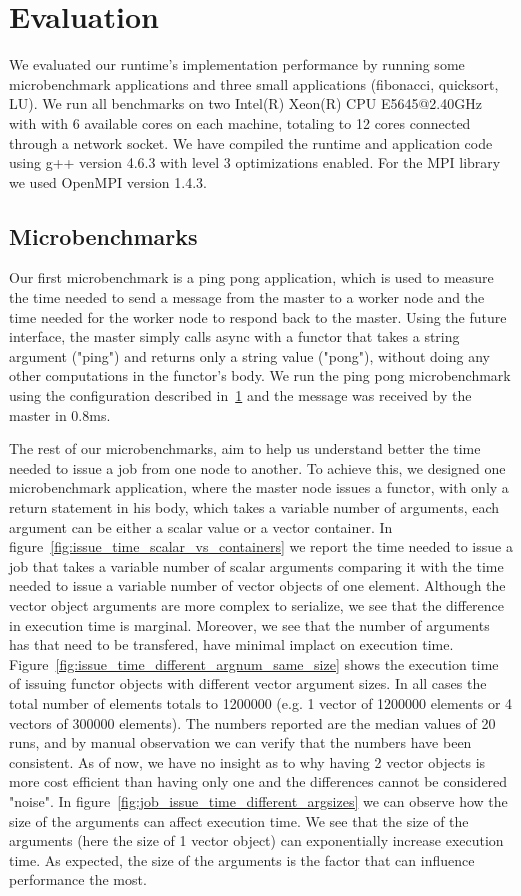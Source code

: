 \chapter{Evaluation}
\label{sect:eval_intro}
	We evaluated our runtime's implementation performance by running some microbenchmark applications and
three small applications (fibonacci, quicksort, LU).  We run all benchmarks on two Intel(R) Xeon(R) 
CPU E5645@2.40GHz with with 6 available cores on each machine, totaling to 12 cores connected through 
a network socket. We have compiled the runtime and application code using g++ version 4.6.3 with 
level 3 optimizations enabled.  For the MPI library we used OpenMPI version 1.4.3.

\section{Microbenchmarks}
\label{sect:microbenchmark}
	Our first microbenchmark is a ping pong application, which is used to measure the time needed to send a 
message from the master to a worker node and the time needed for the worker node to respond back to the master.
Using the future interface, the master simply calls async with a functor that takes a string argument ("ping") 
and returns only a string value ("pong"), without doing any other computations in the functor's body.  We run
the ping pong microbenchmark using the configuration described in~\ref{sect:eval_intro} and the message was 
received by the master in 0.8ms.


	The rest of our microbenchmarks, aim to help us understand better the time needed to issue a job from one
node to another.  To achieve this, we designed one microbenchmark application, where the master node issues
a functor, with only a return statement in his body, which takes a variable number of arguments, each argument
can be either a scalar value or a vector container.  In figure~\ref{fig:issue_time_scalar_vs_containers} we report
the time needed to issue a job that takes a variable number of scalar arguments comparing it with the time needed
to issue a variable number of vector objects of one element.  Although the vector object arguments are more complex
to serialize, we see that the difference in execution time is marginal.  Moreover, we see that the number of arguments
has that need to be transfered, have minimal implact on execution time.  
Figure~\ref{fig:issue_time_different_argnum_same_size} shows the execution time of issuing functor objects with different
vector argument sizes.  In all cases the total number of elements totals to 1200000 (e.g. 1 vector of 1200000 elements or
4 vectors of 300000 elements).   The numbers reported are the median values of 20 runs, and by manual observation 
we can verify that the numbers have been consistent.
As of now, we have no insight as to why having 2 vector objects is more cost efficient
than having only one and the differences cannot be considered "noise". In figure~\ref{fig:job_issue_time_different_argsizes}
we can observe how the size of the arguments can affect execution time.  We see that the size of the arguments (here the 
size of 1 vector object) can exponentially increase execution time.  As expected, the size of the arguments is the factor
that can influence performance the most.

